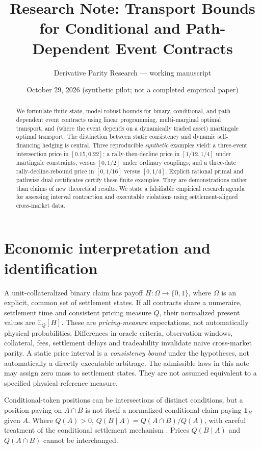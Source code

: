 \documentclass[11pt]{article}
\title{Research Note: Transport Bounds for Conditional and Path-Dependent Event Contracts}
\author{Derivative Parity Research --- working manuscript}
\date{October 29, 2026 \quad (synthetic pilot; not a completed empirical paper)}
\newcommand{\one}{\mathbf{1}}
\newcommand{\EE}{\mathbb{E}}
\begin{document}
\maketitle
\begin{abstract}
We formulate finite-state, model-robust bounds for binary, conditional, and
path-dependent event contracts using linear programming, multi-marginal optimal
transport, and (where the event depends on a dynamically traded asset)
martingale optimal transport. The distinction between static consistency and
dynamic self-financing hedging is central. Three reproducible \emph{synthetic}
examples yield: a three-event intersection price in $[0.15,0.22]$; a
rally-then-decline price in $[1/12,1/4]$ under martingale constraints, versus
$[0,1/2]$ under ordinary couplings; and a three-date
rally-decline-rebound price in $[0,1/16]$ versus $[0,1/4]$. Explicit rational
primal and pathwise dual certificates certify these finite examples.
They are demonstrations rather than claims of new theoretical results.
We state a falsifiable empirical research agenda for assessing interval
contraction and executable violations using settlement-aligned cross-market data.
\end{abstract}

\section{Economic interpretation and identification}
A unit-collateralized binary claim has payoff $H\colon\Omega\to\{0,1\}$,
where $\Omega$ is an explicit, common set of settlement states. If all
contracts share a numeraire, settlement time and consistent pricing measure
$Q$, their normalized present values are $\EE_Q[H]$. These are
\emph{pricing-measure} expectations, not automatically physical probabilities.
Differences in oracle criteria, observation windows, collateral, fees,
settlement delays and tradeability invalidate naive cross-market parity.
A static price interval is a \emph{consistency bound} under the hypotheses,
not automatically a directly executable arbitrage.
The admissible laws in this note may assign zero mass to settlement states.
They are not assumed equivalent to a specified physical reference measure.

Conditional-token positions can be intersections of distinct conditions, but
a position paying on $A\cap B$ is not itself a normalized conditional claim
paying $\one_B$ given $A$. Where $Q(A)>0$, $Q(B\mid A)=Q(A\cap B)/Q(A)$,
with careful treatment of the conditional settlement mechanism
\citep{gnosisconditional}. Prices $Q(B\mid A)$ and $Q(A\cap B)$ cannot be
interchanged.
\end{document}
